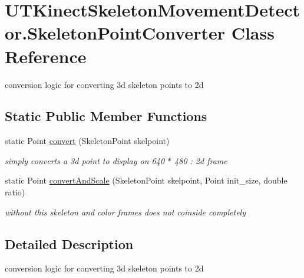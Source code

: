 \hypertarget{class_u_t_kinect_skeleton_movement_detector_1_1_skeleton_point_converter}{\section{U\-T\-Kinect\-Skeleton\-Movement\-Detector.\-Skeleton\-Point\-Converter Class Reference}
\label{class_u_t_kinect_skeleton_movement_detector_1_1_skeleton_point_converter}
}


conversion logic for converting 3d skeleton points to 2d  


\subsection*{Static Public Member Functions}
\begin{DoxyCompactItemize}
\item 
static Point \hyperlink{class_u_t_kinect_skeleton_movement_detector_1_1_skeleton_point_converter_a157fd1dacf2febbac43e5f7d73e68714}{convert} (Skeleton\-Point skelpoint)
\begin{DoxyCompactList}\small\item\em simply converts a 3d point to display on 640 $\ast$ 480 \-: 2d frame \end{DoxyCompactList}\item 
static Point \hyperlink{class_u_t_kinect_skeleton_movement_detector_1_1_skeleton_point_converter_a4c80e4c9498cf339d1c70b067852a51c}{convert\-And\-Scale} (Skeleton\-Point skelpoint, Point init\-\_\-size, double ratio)
\begin{DoxyCompactList}\small\item\em without this skeleton and color frames does not coinside completely \end{DoxyCompactList}\end{DoxyCompactItemize}


\subsection{Detailed Description}
conversion logic for converting 3d skeleton points to 2d 



